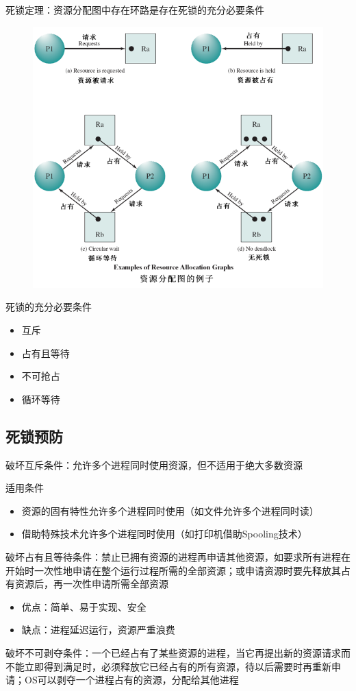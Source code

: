 死锁定理：资源分配图中存在环路是存在死锁的充分必要条件
\begin{figure}[H]
    \centering
    \includegraphics[width=0.6\linewidth]{fig/resource_graph.png}
\end{figure}

死锁的充分必要条件
\begin{itemize}
    \item 互斥
    \item 占有且等待
    \item 不可抢占
    \item 循环等待
\end{itemize}

\subsection{死锁预防}
破坏互斥条件：允许多个进程同时使用资源，但不适用于绝大多数资源

适用条件
\begin{itemize}
\item 资源的固有特性允许多个进程同时使用（如文件允许多个进程同时读）
\item 借助特殊技术允许多个进程同时使用（如打印机借助Spooling技术）
\end{itemize}

破坏占有且等待条件：禁止已拥有资源的进程再申请其他资源，如要求所有进程在开始时一次性地申请在整个运行过程所需的全部资源；或申请资源时要先释放其占有资源后，再一次性申请所需全部资源
\begin{itemize}
    \item 优点：简单、易于实现、安全
    \item 缺点：进程延迟运行，资源严重浪费
\end{itemize}

破坏不可剥夺条件：一个已经占有了某些资源的进程，当它再提出新的资源请求而不能立即得到满足时，必须释放它已经占有的所有资源，待以后需要时再重新申请；OS可以剥夺一个进程占有的资源，分配给其他进程

